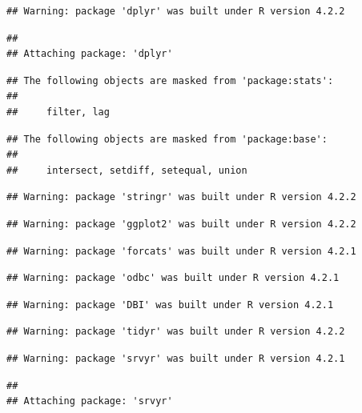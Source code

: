 \documentclass[
  12pt,
]{article}
\author{}
\date{\vspace{-2.5em}}
\begin{document}
\setmainfont{Poppins}

\begin{verbatim}
## Warning: package 'dplyr' was built under R version 4.2.2
\end{verbatim}

\begin{verbatim}
## 
## Attaching package: 'dplyr'
\end{verbatim}

\begin{verbatim}
## The following objects are masked from 'package:stats':
## 
##     filter, lag
\end{verbatim}

\begin{verbatim}
## The following objects are masked from 'package:base':
## 
##     intersect, setdiff, setequal, union
\end{verbatim}

\begin{verbatim}
## Warning: package 'stringr' was built under R version 4.2.2
\end{verbatim}

\begin{verbatim}
## Warning: package 'ggplot2' was built under R version 4.2.2
\end{verbatim}

\begin{verbatim}
## Warning: package 'forcats' was built under R version 4.2.1
\end{verbatim}

\begin{verbatim}
## Warning: package 'odbc' was built under R version 4.2.1
\end{verbatim}

\begin{verbatim}
## Warning: package 'DBI' was built under R version 4.2.1
\end{verbatim}

\begin{verbatim}
## Warning: package 'tidyr' was built under R version 4.2.2
\end{verbatim}

\begin{verbatim}
## Warning: package 'srvyr' was built under R version 4.2.1
\end{verbatim}

\begin{verbatim}
## 
## Attaching package: 'srvyr'
\end{verbatim}
\end{document}
